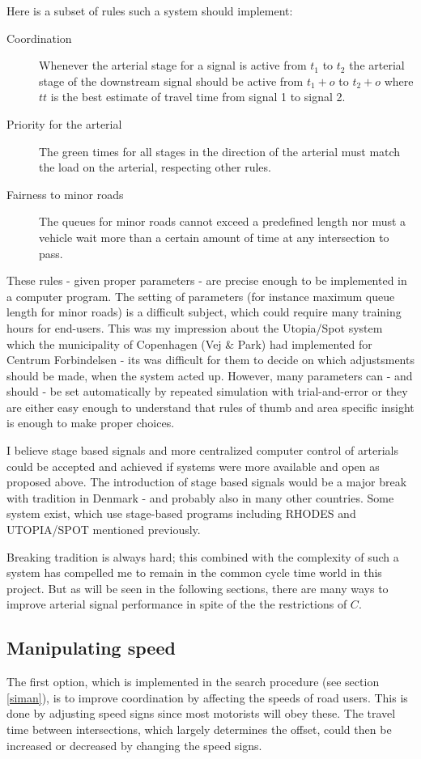 Here is a subset of rules such a system should implement:

\begin{description}
\item[Coordination]
Whenever the arterial stage for a signal is active from $t_1$ to $t_2$ the arterial stage of the downstream signal should be active from $t_1 + o$ to $t_2 + o$ where $tt$ is the best estimate of travel time from signal 1 to signal 2.
\item[Priority for the arterial]
The green times for all stages in the direction of the arterial must match the load on the arterial, respecting other rules.
\item[Fairness to minor roads]
The queues for minor roads cannot exceed a predefined length nor must a vehicle wait more than a certain amount of time at any intersection to pass.
\end{description}

These rules - given proper parameters - are precise enough to be implemented in a computer program. The setting of parameters (for instance maximum queue length for minor roads) is a difficult subject, which could require many training hours for end-users. This was my impression about the Utopia/Spot system which the municipality of Copenhagen (Vej \& Park) had implemented for Centrum Forbindelsen - its was difficult for them to decide on which adjustsments should be made, when the system acted up. 
However, many parameters can - and should - be set automatically by repeated simulation with trial-and-error or they are either easy enough to understand that rules of thumb and area specific insight is enough to make proper choices.

I believe stage based signals and more centralized computer control of arterials could be accepted and achieved if systems were more available and open as proposed above. The introduction of stage based signals would be a major break with tradition in Denmark - and probably also in many other countries. Some system exist, which use stage-based programs including RHODES \cite{rhodes} and UTOPIA/SPOT \cite{utopia_spot} mentioned previously.

Breaking tradition is always hard; this combined with the complexity of such a system has compelled me to remain in the common cycle time world in this project. But as will be seen in the following sections, there are many ways to improve arterial signal performance in spite of the the restrictions of $C$.

\subsection{Manipulating speed}
The first option, which is implemented in the search procedure (see section \ref{siman}), is to improve coordination by affecting the speeds of road users. This is done by adjusting speed signs since most motorists will obey these. The travel time between intersections, which largely determines the offset, could then be increased or decreased by changing the speed signs. 

